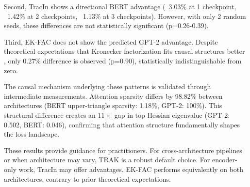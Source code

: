 Second, TracIn shows a directional BERT advantage (~3.03\% at 1 checkpoint, ~1.42\% at 2 checkpoints, ~1.13\% at 3 checkpoints). However, with only 2 random seeds, these differences are not statistically significant (p=0.26-0.39).

Third, EK-FAC does not show the predicted GPT-2 advantage. Despite theoretical expectations that Kronecker factorization fits causal structures better \citep{grosse2023studying}, only 0.27\% difference is observed (p=0.90), statistically indistinguishable from zero.

The causal mechanism underlying these patterns is validated through intermediate measurements. Attention sparsity differs by 98.82\% between architectures (BERT upper-triangle sparsity: 1.18\%, GPT-2: 100\%). This structural difference creates an $11\times$ gap in top Hessian eigenvalue (GPT-2: 0.502, BERT: 0.046), confirming that attention structure fundamentally shapes the loss landscape.

These results provide guidance for practitioners. For cross-architecture pipelines or when architecture may vary, TRAK is a robust default choice. For encoder-only work, TracIn may offer advantages. EK-FAC performs equivalently on both architectures, contrary to prior theoretical expectations.
